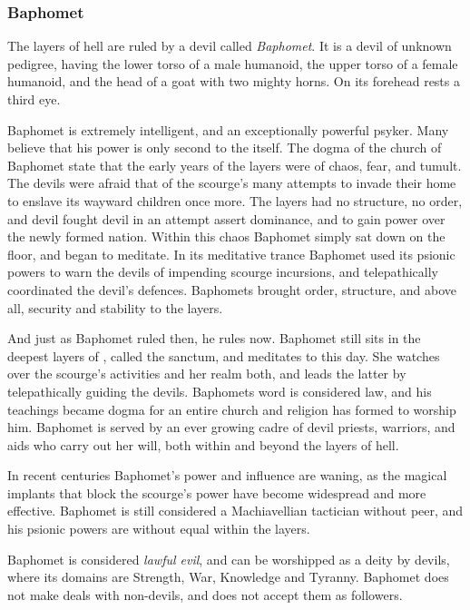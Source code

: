 \subsubsection{Baphomet}
\label{sec:Baphomet}

The layers of hell are ruled by a devil called \emph{Baphomet}. It is a devil
of unknown pedigree, having the lower torso of a male humanoid, the upper torso
of a female humanoid, and the head of a goat with two mighty horns. On its
forehead rests a third eye.

Baphomet is extremely intelligent, and an exceptionally powerful psyker. Many
believe that his power is only second to the  itself. The
dogma of the church of Baphomet state that the early years of the layers were
of chaos, fear, and tumult. The devils were afraid that of the scourge's many
attempts to invade their home to enslave its wayward children once more. The
layers had no structure, no order, and devil fought devil in an attempt assert
dominance, and to gain power over the newly formed nation. Within this chaos
Baphomet simply sat down on the floor, and began to meditate. In its
meditative trance Baphomet used its psionic powers to warn the devils of
impending scourge incursions, and telepathically coordinated the devil's
defences. Baphomets brought order, structure, and above all, security and
stability to the layers.

And just as Baphomet ruled then, he rules now. Baphomet still sits in the
deepest layers of , called the sanctum, and meditates to
this day. She watches over the scourge's activities and her realm both, and
leads the latter by telepathically guiding the devils. Baphomets word is
considered law, and his teachings became dogma for an entire church and
religion has formed to worship him. Baphomet is served by an ever growing
cadre of devil priests, warriors, and aids who carry out her will, both within
and beyond the layers of hell.

In recent centuries Baphomet's power and influence are waning, as the magical
implants that block the scourge's power have become widespread and more
effective. Baphomet is still considered a Machiavellian tactician without
peer, and his psionic powers are without equal within the layers.


\begin{35e}
  Baphomet is considered \emph{lawful evil}, and can be worshipped as a
  deity by devils, where its domains are Strength, War, Knowledge and
  Tyranny. Baphomet does not make deals with non-devils, and does not
  accept them as followers.
\end{35e}

